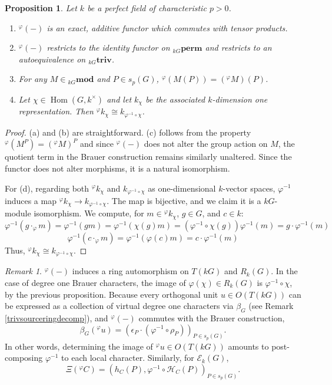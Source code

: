 \documentclass[10pt,letterpaper, boxed, cm]{amsart}
\newcommand{\Hom}{\operatorname{Hom}}
\newcommand{\inv}{^{-1}}
\newcommand{\calE}{\mathcal{E}}
\newcommand{\calH}{\mathcal{H}}
\newtheorem{prop}[theorem]{Proposition}
\theoremstyle{remark}
\newtheorem{remark}[theorem]{Remark}
\theoremstyle{definition}
\begin{document}
	\begin{prop}\label{prop:propsoftwist}
        Let $k$ be a perfect field of characteristic $p > 0$.
		\begin{enumerate}
			\item $^\varphi(-)$ is an exact, additive functor which commutes with tensor products.
			\item $^\varphi(-)$ restricts to the identity functor on ${}_{kG}\textbf{perm}$ and restricts to an autoequivalence on ${}_{kG}\textbf{triv}$.
			\item For any $M \in {}_{kG}\mathbf{mod}$ and $P\in s_p(G)$, $^\varphi(M(P)) = ({}^\varphi M)(P)$.
			\item Let $\chi \in \Hom(G, k^\times)$ and let $k_\chi$ be the associated $k$-dimension one representation. Then ${}^\varphi k_\chi \cong k_{\varphi\inv \circ \chi}$.
		\end{enumerate}
	\end{prop}
	\begin{proof}
		(a) and (b) are straightforward. (c) follows from the property $^\varphi (M^P) = ({}^\varphi M)^P$ and since $^\varphi(-)$ does not alter the group action on $M$, the quotient term in the Brauer construction remains similarly unaltered. Since the functor does not alter morphisms, it is a natural isomorphism.

		For (d), regarding both ${}^\varphi k_\chi$ and $k_{\varphi\inv \circ \chi}$ as one-dimensional $k$-vector spaces, $\varphi\inv$ induces a map ${}^\varphi k_\chi \to k_{\varphi\inv \circ \chi}$. The map is bijective, and we claim it is a $kG$-module isomorphism. We compute, for $m \in {}^\varphi k_\chi$, $g \in G$, and $c \in k$:
		\[\varphi\inv (g\cdot_\varphi m) = \varphi\inv (gm) = \varphi\inv(\chi(g)m) = (\varphi\inv\circ \chi(g))\varphi\inv(m) = g\cdot \varphi\inv(m) \]
		\[\varphi\inv (c\cdot_\varphi m) = \varphi\inv (\varphi(c)m) = c\cdot\varphi\inv(m)\]
		Thus, ${}^\varphi k_\chi \cong k_{\varphi\inv \circ \chi}$.
	\end{proof}


	\begin{remark}
		$^\varphi(-)$ induces a ring automorphism on $T(kG)$ and $R_k(G)$. In the case of degree one Brauer characters, the image of $\varphi(\chi) \in R_k(G)$ is $\varphi\inv\circ\chi$, by the previous proposition. Because every orthogonal unit $u \in O(T(kG))$ can be expressed as a collection of virtual degree one characters via $\beta_G$ (see Remark \ref{trivsourceringdecomp}), and $^\varphi(-)$ commutes with the Brauer construction, \[\beta_G({}^\varphi u) = (\epsilon_P \cdot (\varphi\inv\circ\rho_P))_{P\in s_p(G)}.\] In other words, determining the image of $^\varphi u \in O(T(kG))$ amounts to post-composing $\varphi\inv$ to each local character. Similarly, for $\calE_k(G)$, \[\Xi({}^\varphi C) = (h_C(P), \varphi\inv \circ \calH_C(P))_{P \in s_p(G)}.\]
	\end{remark}
\end{document}
